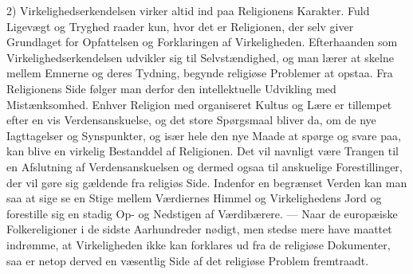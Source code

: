 \documentclass[12pt,a4paper]{book}
\begin{document}
2) Virkelighedserkendelsen virker altid ind paa Religionens Karakter. Fuld Ligevægt og
Tryghed raader kun, hvor det er Religionen, der selv giver Grundlaget for Opfattelsen og
Forklaringen af Virkeligheden. Efterhaanden som Virkelighedserkendelsen udvikler sig til
Selvstændighed, og man lærer at skelne mellem Emnerne og deres Tydning, begynde religiøse
Problemer at opstaa. Fra Religionens Side følger man derfor den intellektuelle Udvikling med
Mistænksomhed. Enhver Religion med organiseret Kultus og Lære er tillempet efter en vis
Verdensanskuelse, og det store Spørgsmaal bliver da, om de nye Iagttagelser og Synspunkter,
og især hele den nye Maade at spørge og svare paa, kan blive en virkelig Bestanddel af
Religionen. Det vil navnligt være Trangen til en Afslutning af Verdensanskuelsen og dermed
ogsaa til anskuelige Forestillinger, der vil gøre sig gældende fra religiøs Side. Indenfor en
begrænset Verden kan man saa at sige se en Stige mellem Værdiernes Himmel og Virkelighedens
Jord og forestille sig en stadig Op- og Nedstigen af Værdibærere. --- Naar de europæiske
Folkereligioner i de sidste Aarhundreder nødigt, men stedse mere have maattet indrømme, at
Virkeligheden ikke kan forklares ud fra de religiøse Dokumenter, saa er netop derved en
væsentlig Side af det religiøse Problem fremtraadt.
\end{document}
